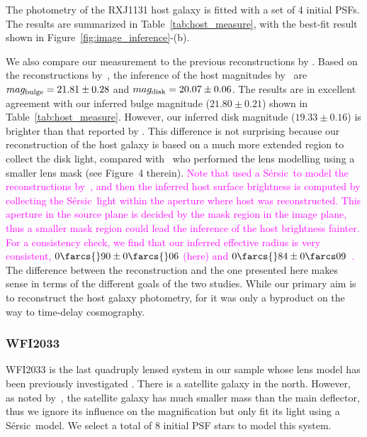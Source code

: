 \documentclass[fleqn,usenatbib]{mnras}
\newcommand{\sersic}{S\'ersic}
\newcommand{\pink}[1]{{\textcolor{magenta}{#1}}}
\begin{document}
The photometry of the RXJ1131 host galaxy is fitted with a set of 4 initial PSFs. The results are summarized in Table~\ref{tab:host_measure}, with the best-fit result shown in Figure~\ref{fig:image_inference}-(b).

We also compare our measurement to the previous reconstructions by \citet{Ding2017b}. Based on the reconstructions by~\citet{Suyu2013}, the inference of the host magnitudes by~\citet{Ding2017b} are $mag_{\rm bulge} = 21.81 \pm 0.28$ and $mag_{\rm disk} = 20.07\pm0.06$. The results are in excellent agreement with our inferred bulge magnitude ($21.80\pm0.21$)   shown in Table~\ref{tab:host_measure}. However, our inferred disk magnitude ($19.33\pm0.16$) is brighter than that reported by \citet{Ding2017b}. This difference is not surprising because our reconstruction of the host galaxy is based on a much more extended region to collect the disk light, compared with~\citet{Suyu2013} who performed the lens modelling using a smaller lens mask (see Figure~4 therein). \pink{Note that \citet{Ding2017b} used a \sersic\ to model the reconstructions by~\citet{Suyu2013}, and then the inferred host surface brightness is computed by collecting the \sersic\ light within the aperture where host was reconstructed. This aperture in the source plane is decided by the mask region in the image plane, thus a smaller mask region could lead the inference of the host brightness fainter. For a consistency check, we find that our inferred effective radius is very consistent, $0\farcs{}90 \pm 0\farcs{}06$ (here) and $0\farcs{}84 \pm 0\farcs09$~\citep{Ding2017b}.} The difference between the \citet{Suyu2013} reconstruction and the one presented here makes sense in terms of the different goals of the two studies. While our primary aim is to reconstruct the host galaxy photometry, for \citet{Suyu2013} it was only a byproduct on the way to time-delay cosmography.

\subsubsection{WFI2033}
WFI2033 is the last quadruply lensed system in our sample whose lens model has been previously investigated \citep{Rusu2019}. There is a satellite galaxy in the north. However, as noted by~\citet{Rusu2019}, the satellite galaxy has much smaller mass than the main deflector, thus we ignore its influence on the magnification but only fit its light using a \sersic\ model. We select a total of 8 initial PSF stars to model this system.
\end{document}
